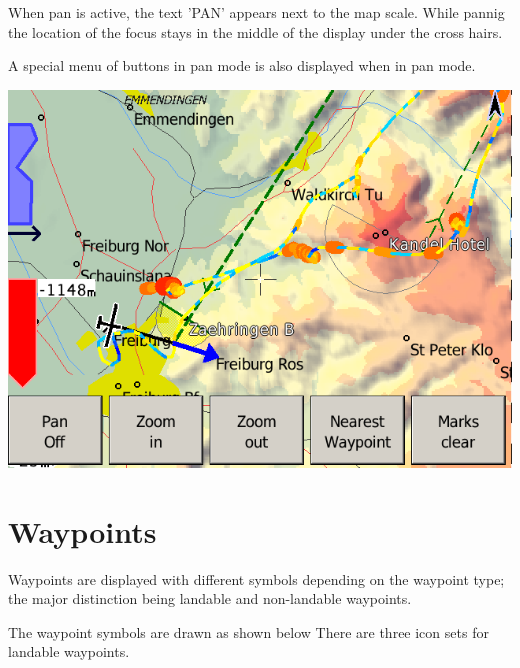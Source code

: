 When pan is active, the text 'PAN' appears next to the map scale.  While
pannig the location of the focus stays in the middle of the display under the
cross hairs.

A special menu of buttons in pan mode is also displayed when in pan
mode.

\begin{center}
\includegraphics[angle=0,width=0.8\linewidth,keepaspectratio='true']{figures/pan.png}
\end{center}

\section{Waypoints} \label{sec:waypoint-schemes}
Waypoints are displayed with different symbols depending on the
waypoint type; the major distinction being landable and non-landable
waypoints.

The waypoint symbols are drawn as shown below There are three icon sets for
landable waypoints. 

